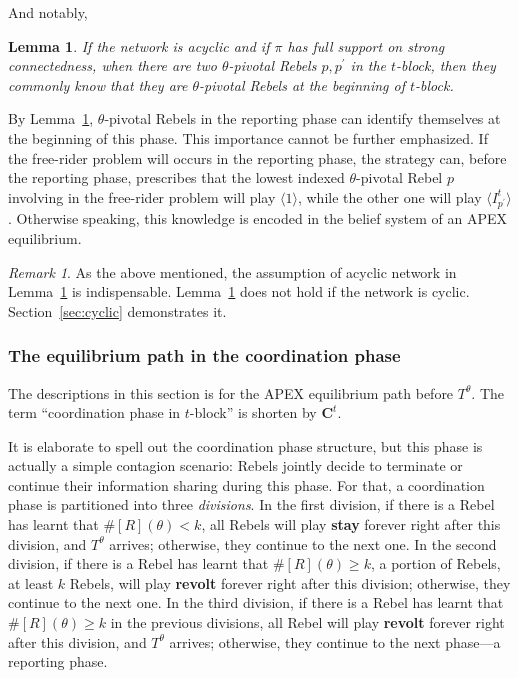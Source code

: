 \documentclass[12pt,letter]{article}
\newcommand{\Kappa}{\mathbf{C}}
\newtheorem{lemma}{Lemma}[section]
\theoremstyle{definition}
\theoremstyle{remark}
\newtheorem*{remark}{Remark}
\theoremstyle{claim}
\begin{document}
And notably,

\begin{lemma}
\label{lemman_pivotals_CK}
If the network is acyclic and if $\pi$ has full support on strong connectedness, when there are two $\theta$-pivotal Rebels $p,p^{'}$ in the $t$-block, then they commonly know that they are $\theta$-pivotal Rebels at the beginning of $t$-block.
\end{lemma}

By Lemma~\ref{lemman_pivotals_CK}, $\theta$-pivotal Rebels in the reporting phase can identify themselves at the beginning of this phase. This importance cannot be further emphasized. If the free-rider problem will occurs in the reporting phase, the strategy can, before the reporting phase, prescribes that the lowest indexed $\theta$-pivotal Rebel $p$ involving in the free-rider problem will play $\langle 1 \rangle$, while the other one will play $\langle I^t_{p^{'}} \rangle$. Otherwise speaking, this knowledge is encoded in the belief system of an APEX equilibrium. 

\begin{remark}
As the above mentioned, the assumption of acyclic network in Lemma~\ref{lemman_pivotals_CK} is indispensable. Lemma~\ref{lemman_pivotals_CK} does not hold if the network is cyclic. Section~\ref{sec:cyclic} demonstrates it.
\end{remark}






\subsubsection{The equilibrium path in the coordination phase}
\label{sec:eq_cd}
The descriptions in this section is for the APEX equilibrium path {before} $T^{\theta}$. The term ``coordination phase in $t$-block'' is shorten by $\Kappa^{t}$.  

It is elaborate to spell out the coordination phase structure, but this phase is actually a simple contagion scenario: Rebels jointly decide to terminate or continue their information sharing during this phase. For that, a coordination phase is partitioned into three \textit{divisions}. In the first division, if there is a Rebel has learnt that $\#[R](\theta)<k$, all Rebels will play \textbf{stay} forever right after this division, and $T^{\theta}$ arrives; otherwise, they continue to the next one. In the second division, if there is a Rebel has learnt that $\#[R](\theta)\geq k$, a portion of Rebels, at least $k$ Rebels, will play \textbf{revolt} forever right after this division; otherwise, they continue to the next one. In the third division, if there is a Rebel has learnt that $\#[R](\theta)\geq k$ in the previous divisions, all Rebel will play \textbf{revolt} forever right after this division, and $T^{\theta}$ arrives; otherwise, they continue to the next phase---a reporting phase.
\end{document}
